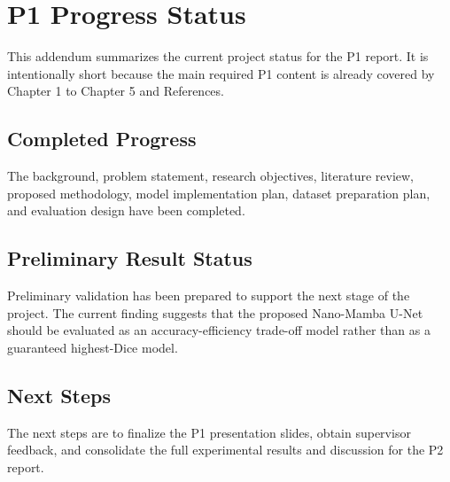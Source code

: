 
\chapter*{P1 Progress Status}

This addendum summarizes the current project status for the P1 report. It is intentionally short because the main required P1 content is already covered by Chapter 1 to Chapter 5 and References.

\section*{Completed Progress}
The background, problem statement, research objectives, literature review, proposed methodology, model implementation plan, dataset preparation plan, and evaluation design have been completed.

\section*{Preliminary Result Status}
Preliminary validation has been prepared to support the next stage of the project. The current finding suggests that the proposed Nano-Mamba U-Net should be evaluated as an accuracy-efficiency trade-off model rather than as a guaranteed highest-Dice model.

\section*{Next Steps}
The next steps are to finalize the P1 presentation slides, obtain supervisor feedback, and consolidate the full experimental results and discussion for the P2 report.
